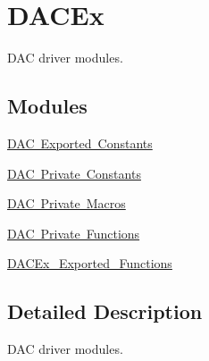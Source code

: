 \hypertarget{group___d_a_c_ex}{}\section{D\+A\+C\+Ex}
\label{group___d_a_c_ex}


D\+AC driver modules.  


\subsection*{Modules}
\begin{DoxyCompactItemize}
\item 
\mbox{\hyperlink{group___d_a_c_ex___exported___constants}{D\+A\+C Exported Constants}}
\item 
\mbox{\hyperlink{group___d_a_c_ex___private___constants}{D\+A\+C Private Constants}}
\item 
\mbox{\hyperlink{group___d_a_c_ex___private___macros}{D\+A\+C Private Macros}}
\item 
\mbox{\hyperlink{group___d_a_c_ex___private___functions}{D\+A\+C Private Functions}}
\item 
\mbox{\hyperlink{group___d_a_c_ex___exported___functions}{D\+A\+C\+Ex\+\_\+\+Exported\+\_\+\+Functions}}
\end{DoxyCompactItemize}


\subsection{Detailed Description}
D\+AC driver modules. 

